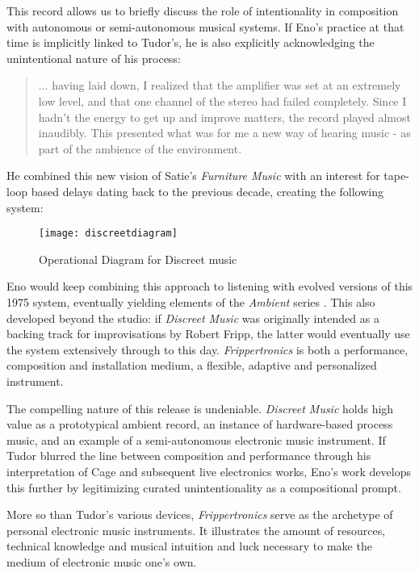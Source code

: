 \begin{itemize}
This record allows us to briefly discuss the role of intentionality in composition with autonomous or semi-autonomous musical systems. If Eno's practice at that time is implicitly linked to Tudor's, he is also explicitly acknowledging the unintentional nature of his process: 

\begin{quote} ... having laid down, I realized that the amplifier was set at an extremely low level, and that one channel of the stereo had failed completely. Since I hadn't the energy to get up and improve matters, the record played almost inaudibly. This presented what was for me a new way of hearing music - as part of the ambience of the environment.
	
	\citep{eno1975}
	\end{quote}

He combined this new vision of Satie's \emph{Furniture Music} \citep{satie} with an interest for tape-loop based delays dating back to the previous decade, creating the following system: 

\begin{figure}[h!]
  \caption{Operational Diagram for Discreet music}
  \centering
    \texttt{[image: discreetdiagram]}
\end{figure}

Eno would keep combining this approach to listening with evolved versions of this 1975 system, eventually yielding elements of the \emph{Ambient} series \citep{eno1978,eno1980,eno1980b,eno1982}. This also developed beyond the studio: if \emph{Discreet Music} was originally intended as a backing track for improvisations by Robert Fripp, the latter would eventually use the system extensively through to this day. \emph{Frippertronics} is both a performance, composition and installation medium, a flexible, adaptive and personalized instrument.  

The compelling nature of this release is undeniable. \emph{Discreet Music } holds high value as a prototypical ambient record, an instance of hardware-based process music, and an example of a semi-autonomous electronic music instrument. If Tudor blurred the line between composition and performance through his interpretation of Cage and subsequent live electronics works, Eno's work develops this further by legitimizing curated unintentionality as a compositional prompt. 

More so than Tudor's various devices, \emph{Frippertronics} serve as the archetype of personal electronic music instruments. It illustrates the amount of resources, technical knowledge and musical intuition and luck necessary to make the medium of electronic music one's own. 


\end{itemize}
